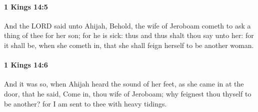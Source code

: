 		\paragraph{1 Kings 14:5} %
			\label{1KINGS-14-5}

			And the LORD said unto Ahijah, Behold, the wife of Jeroboam cometh to ask a thing of thee for her son; for he is sick: thus and thus shalt thou say unto her: for it shall be, when she cometh in, that she shall feign herself to be another woman.


		\paragraph{1 Kings 14:6} %
			\label{1KINGS-14-6}

			And it was so, when Ahijah heard the sound of her feet, as she came in at the door, that he said, Come in, thou wife of Jeroboam; why feignest thou thyself to be another? for I am sent to thee with heavy tidings.

